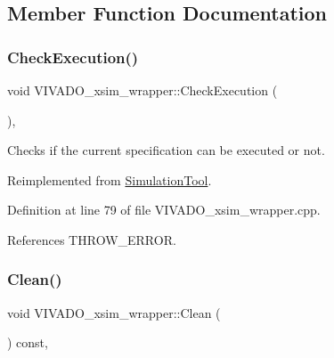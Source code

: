 \subsection{Member Function Documentation}
\mbox{\label{classVIVADO__xsim__wrapper_a92bc3d2006fc9eea8741aae4856e0d75}} 
\subsubsection{\texorpdfstring{Check\+Execution()}{CheckExecution()}}
{\footnotesize\ttfamily void V\+I\+V\+A\+D\+O\+\_\+xsim\+\_\+wrapper\+::\+Check\+Execution (\begin{DoxyParamCaption}{ }\end{DoxyParamCaption})\hspace{0.3cm}{\ttfamily [override]}, {\ttfamily [virtual]}}



Checks if the current specification can be executed or not. 



Reimplemented from \hyperlink{classSimulationTool_a24b4cde0b09c7496918d20f3896989b6}{Simulation\+Tool}.



Definition at line 79 of file V\+I\+V\+A\+D\+O\+\_\+xsim\+\_\+wrapper.\+cpp.



References T\+H\+R\+O\+W\+\_\+\+E\+R\+R\+OR.

\mbox{\label{classVIVADO__xsim__wrapper_ad24840f9dda8644309661c912f37c150}} 
\subsubsection{\texorpdfstring{Clean()}{Clean()}}
{\footnotesize\ttfamily void V\+I\+V\+A\+D\+O\+\_\+xsim\+\_\+wrapper\+::\+Clean (\begin{DoxyParamCaption}{ }\end{DoxyParamCaption}) const\hspace{0.3cm}{\ttfamily [override]}, {\ttfamily [virtual]}}



